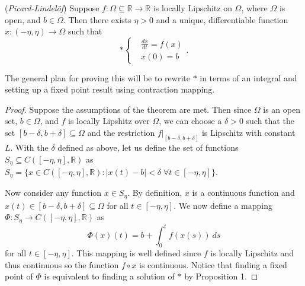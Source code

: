 \documentclass[11pt]{article}
\theoremstyle{definition}
\newcommand{\R}{\mathbb{R}}                      %
\newcommand{\bconditions}{\left\{\begin{aligned}}
\newcommand{\econditions}{\end{aligned}\right.}
\begin{document}
\begin{shaded}
\theorem (\textit{Picard-Lindelöf}) Suppose $f:\Omega\subseteq \R\to\R$ is locally Lipschitz on $\Omega$, where $\Omega$ is open, and $b\in \Omega$. Then there exists $\eta>0$ and a unique, differentiable function $x:(-\eta,\eta)\to\Omega$ such that
$$
*\bconditions
&\frac{dx}{dt}=f(x)\\
&x(0)=b
\econditions.
$$
\end{shaded}
The general plan for proving this will be to rewrite $*$ in terms of an integral and setting up a fixed point result using contraction mapping.
\begin{proof}
    Suppose the assumptions of the theorem are met. Then since $\Omega$ is an open set, $b\in\Omega$, and $f$ is locally Lipshitz over $\Omega$, we can choose a $\delta>0$ such that the set $[b-\delta,b+\delta]\subseteq \Omega$ and the restriction $f|_{[b-\delta,b+\delta]}$ is Lipschitz with constant $L$. With the $\delta$ defined as above, let us define the set of functions $S_\eta\subseteq C([-\eta,\eta],\R)$ as $S_\eta=\{x\in C([-\eta,\eta],\R):|x(t)-b|<\delta\;\forall t\in [-\eta,\eta]\}$. 

    Now consider any function $x\in S_\eta$. By definition, $x$ is a continuous function and $x(t)\in [b-\delta,b+\delta]\subseteq \Omega$ for all $t\in [-\eta,\eta]$. We now define a mapping $\Phi: S_\eta\to C([-\eta,\eta],\R)$ as 
    $$
    \Phi(x)(t)=b+\int_0^t f(x(s))~ds
    $$
    for all $t\in[-\eta,\eta]$. This mapping is well defined since $f$ is locally Lipschitz and thus continuous so the function $f\circ x$ is continuous. Notice that finding a fixed point of $\Phi$ is equivalent to finding a solution of $*$ by Proposition 1.


\end{proof}
\end{document}
